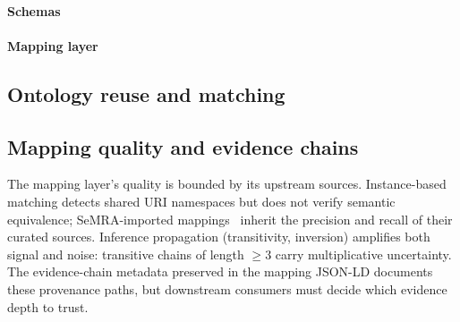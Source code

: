 \documentclass[12pt]{article}
\begin{document}
\paragraph{Schemas}
\paragraph{Mapping layer}


\subsection{Ontology reuse and matching}

\subsection{Mapping quality and evidence chains}

The mapping layer's quality is bounded by its upstream sources.
Instance-based matching detects shared URI namespaces but does not
verify semantic equivalence; SeMRA-imported
mappings~\cite{hoyt_assembly_2025} inherit the precision and recall of their
curated sources.
Inference propagation (transitivity, inversion) amplifies both
signal and noise: transitive chains of length $\geq 3$ carry
multiplicative uncertainty.
The evidence-chain metadata preserved in the mapping JSON-LD
documents these provenance paths, but downstream consumers must
decide which evidence depth to trust.
\end{document}
